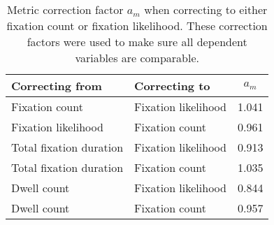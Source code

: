 \begin{table}[ht]
\centering
\caption{Metric correction factor $a_m$ when correcting to either fixation count or fixation likelihood. These correction factors were used to make sure all dependent variables are comparable.} 
\label{tab:metric_correction}
\begin{tabular}{llc}
  \hline
Correcting from & Correcting to & $a_m$ \\ 
  \hline
Fixation count & Fixation likelihood & 1.041 \\ 
  Fixation likelihood & Fixation count & 0.961 \\ 
  Total fixation duration & Fixation likelihood & 0.913 \\ 
  Total fixation duration & Fixation count & 1.035 \\ 
  Dwell count & Fixation likelihood & 0.844 \\ 
  Dwell count & Fixation count & 0.957 \\ 
   \hline
\end{tabular}
\end{table}
